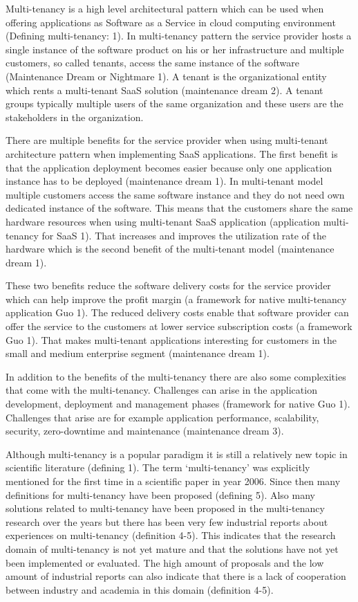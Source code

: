 \documentclass[conference]{sasmoota2017}
\begin{document}
Multi-tenancy is a high level architectural pattern which can be used when offering applications as Software as a Service in cloud computing environment (Defining multi-tenancy: 1). In multi-tenancy pattern the service provider hosts a single instance of the software product on his or her infrastructure and multiple customers, so called tenants, access the same instance of the software (Maintenance Dream or Nightmare 1). A tenant is the organizational entity which rents a multi-tenant SaaS solution (maintenance dream 2). A tenant groups typically multiple users of the same organization and these users are the stakeholders in the organization. 

There are multiple benefits for the service provider when using multi-tenant architecture pattern when implementing SaaS applications. The first benefit is that the application deployment becomes easier because only one application instance has to be deployed (maintenance dream 1). In multi-tenant model multiple customers access the same software instance and they do not need own dedicated instance of the software. This means that the customers share the same hardware resources when using multi-tenant SaaS application (application multi-tenancy for SaaS 1). That increases and improves the utilization rate of the hardware which is the second benefit of the multi-tenant model (maintenance dream 1). 

These two benefits reduce the software delivery costs for the service provider which can help improve the profit margin (a framework for native multi-tenancy application Guo 1). The reduced delivery costs enable that software provider can offer the service to the customers at lower service subscription costs (a framework Guo 1). That makes multi-tenant applications interesting for customers in the small and medium enterprise segment (maintenance dream 1).

In addition to the benefits of the multi-tenancy there are also some complexities that come with the multi-tenancy. Challenges can arise in the application development, deployment and management phases (framework for native Guo 1). Challenges that arise are for example application performance, scalability, security, zero-downtime and maintenance (maintenance dream 3). 

Although multi-tenancy is a popular paradigm it is still a relatively new topic in scientific literature (defining 1). The term ‘multi-tenancy’ was explicitly mentioned for the first time in a scientific paper in year 2006. Since then many definitions for multi-tenancy have been proposed (defining 5). Also many solutions related to multi-tenancy have been proposed in the multi-tenancy research over the years but there has been very few industrial reports about experiences on multi-tenancy (definition 4-5). This indicates that the research domain of multi-tenancy is not yet mature and that the solutions have not yet been implemented or evaluated. The high amount of proposals and the low amount of industrial reports can also indicate that there is a lack of cooperation between industry and academia in this domain (definition 4-5).
\end{document}
